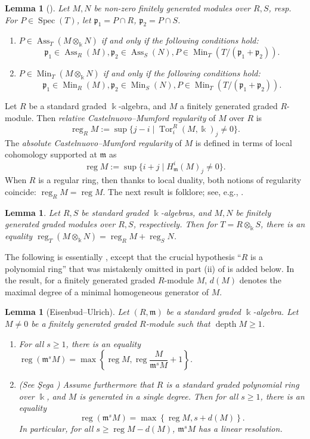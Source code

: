 \documentclass{amsart}
\DeclareMathOperator{\Ass}{Ass}
\DeclareMathOperator{\depth}{depth}
\DeclareMathOperator{\Min}{Min}
\DeclareMathOperator{\Spec}{Spec}
\DeclareMathOperator{\reg}{reg}
\DeclareMathOperator{\Tor}{Tor}
\newcommand{\mm}{\mathfrak{m}}
\newcommand{\pp}{\mathfrak{p}}
\theoremstyle{plain}
\newtheorem{lem}[thm]{Lemma}
\theoremstyle{definition}
\numberwithin{equation}{section}
\newcommand{\kk}{\Bbbk}
\begin{document}
\begin{lem}[{\cite[Theorem 2.5 and its proof]{HNTT}}]
\label{lem_Ass_tensor}
Let $M, N$ be non-zero finitely generated modules over $R,S$, resp. For $P\in \Spec(T)$, let $\pp_1=P\cap R$, $\pp_2=P\cap S$.
\begin{enumerate}[\quad \rm(i)]
\item $P\in \Ass_T(M\otimes_\kk N)$ if and only if the following conditions hold:
\[
\pp_1 \in \Ass_R(M), \pp_2 \in \Ass_S(N), P \in \Min_T(T/(\pp_1+\pp_2)).
\]
\item $P\in \Min_T(M\otimes_\kk N)$ if and only if the following conditions hold:
\[
\pp_1 \in \Min_R(M), \pp_2 \in \Min_S(N), P \in \Min_T(T/(\pp_1+\pp_2)).
\]
\end{enumerate} 
\end{lem}

Let $R$ be a standard graded $\kk$-algebra, and $M$ a finitely generated graded $R$-module. Then \emph{relative Castelnuovo--Mumford regularity} of $M$ over $R$ is
\[
\reg_R M:=\sup\{j-i\mid \Tor^R_i(M,\kk)_j\neq 0\}.
\]
The  \emph{absolute Castelnuovo--Mumford regularity} of $M$ is defined in terms of local cohomology supported at $\mm$ as
\[
\reg M:= \sup\{i+j\mid H^i_\mm(M)_j\neq 0\}.
\]
When $R$ is a regular ring, then thanks to local duality, both notions of regularity coincide: $\reg_R M= \reg M$. The next result is folklore; see, e.g., \cite[Lemma 2.3]{NgV19a}.
\begin{lem}
\label{lem_tensor}
Let $R, S$ be standard graded $\kk$-algebras, and $M, N$ be finitely generated graded modules over $R, S$, respectively. Then for $T=R \otimes_\kk S$, there is an equality $\reg_T (M\otimes_\kk N)=\reg_R M+ \reg_S N$.
\end{lem}

The following is essentially \cite[Lemma 5.3]{NgV19b}, except that the crucial hypothesis ``$R$ is a polynomial ring'' that was mistakenly omitted in part (ii) of \cite[Lemma 5.3]{NgV19b} is added below. In the result, for a finitely generated graded $R$-module $M$, $d(M)$ denotes the maximal degree of a minimal homogeneous generator of $M$.
 
\begin{lem}[Eisenbud--Ulrich]
\label{lem_regmM}
Let $(R,\mm)$ be a standard graded $\kk$-algebra.  Let $M\neq 0$ be a finitely generated graded $R$-module such that $\depth M\ge 1$.
\begin{enumerate}[\quad \rm (i)]
 \item For all $s\ge 1$, there is an equality $\reg (\mm^sM)= \max \left\{\reg M, \reg \dfrac{M}{\mm^s M}+1\right\}$.
\item \textup{(See \c{S}ega \cite[Theorem 3.2]{Se01})} Assume furthermore that $R$ is a standard graded polynomial ring over $\kk$, and $M$ is generated in a single degree. Then for all $s\ge 1$, there is an equality
\[
\reg (\mm^sM)= \max \left\{\reg M, s+d(M)\right\}.
\]
In particular, for all $s\ge \reg M-d(M)$, $\mm^sM$ has a linear resolution.
\end{enumerate}
\end{lem}
\end{document}
